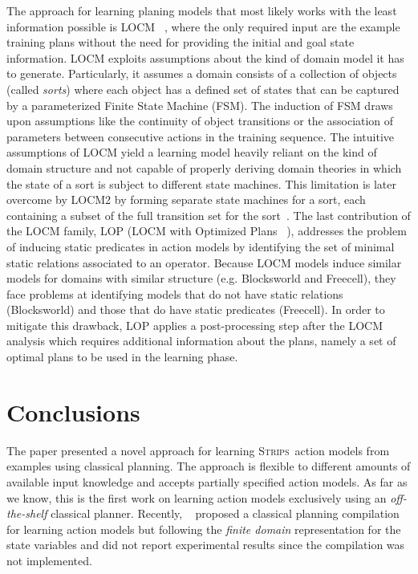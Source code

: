 \documentclass[letterpaper]{article} %
\newcommand{\strips}{\textsc{Strips}}     %
\begin{document}
The approach for learning planing models that most likely works with the least information possible is {\sf LOCM} ~\cite{cresswell2013acquiring}, where the only required input are the example training plans without the need for providing the initial and goal state information. {\sf LOCM} exploits assumptions about the kind of domain model it has to generate. Particularly, it assumes a domain consists of a collection of objects (called \emph{sorts}) where each object has a defined set of states that can be captured by a parameterized Finite State Machine (FSM). The induction of FSM draws upon assumptions like the continuity of object transitions or the association of parameters between consecutive actions in the training sequence. The intuitive assumptions of {\sf LOCM} yield a learning model heavily reliant on the kind of domain structure and not capable of properly deriving domain theories in which the state of a sort is subject to different state machines. This limitation is later overcome by {\sf LOCM2} by forming separate state machines for a sort, each containing a subset of the full transition set for the sort~\cite{cresswell2011generalised}. The last contribution of the {\sf LOCM} family, {\sf LOP} ({\sf LOCM} with Optimized Plans ~\cite{GregoryC16}), addresses the problem of inducing static predicates in action models by identifying the set of minimal static relations associated to an operator. Because {\sf LOCM} models induce similar models for domains with similar structure (e.g. Blocksworld and Freecell), they face problems at identifying models that do not have static relations (Blocksworld) and those that do have static predicates (Freecell). In order to mitigate this drawback, {\sf LOP} applies a post-processing step after the {\sf LOCM} analysis which requires additional information about the plans, namely a set of optimal plans to be used in the learning phase.


\section{Conclusions}
The paper presented a novel approach for learning \strips\ action models from examples using classical planning. The approach is flexible to different amounts of available input knowledge and accepts partially specified action models. As far as we know, this is the first work on learning action models exclusively using an {\em off-the-shelf} classical planner. Recently, ~\citeauthor{stern2017efficient} proposed a classical planning compilation for learning action models but following the {\em finite domain} representation for the state variables and did not report experimental results since the compilation was not implemented.  
\end{document}
